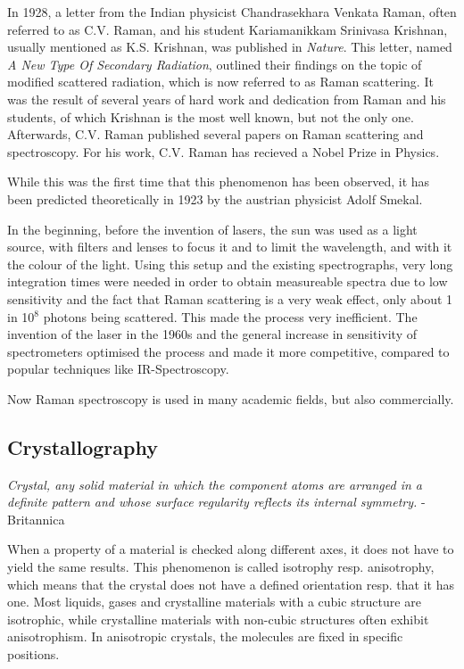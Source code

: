 In 1928, a letter from the Indian physicist Chandrasekhara Venkata Raman, often referred to as C.V. Raman, and his student Kariamanikkam Srinivasa Krishnan, usually mentioned as K.S. Krishnan, was published in \textit{Nature}. This letter, named \textit{A New Type Of Secondary Radiation}, outlined their findings on the topic of modified scattered radiation, which is now referred to as Raman scattering. It was the result of several years of hard work and dedication from Raman and his students, of which Krishnan is the most well known, but not the only one. Afterwards, C.V. Raman published several papers on Raman scattering and spectroscopy. For his work, C.V. Raman has recieved a Nobel Prize in Physics. \cite{ram28}
\bigskip

While this was the first time that this phenomenon has been observed, it has been predicted theoretically in 1923 by the austrian physicist Adolf Smekal.
\bigskip

In the beginning, before the invention of lasers, the sun was used as a light source, with filters and lenses to focus it and to limit the wavelength, and with it the colour of the light. Using this setup and the existing spectrographs, very long integration times were needed in order to obtain measureable  spectra due to low sensitivity and the fact that Raman scattering is a very weak effect, only about 1 in 10\(^8\) photons being scattered. This made the process very inefficient. The invention of the laser in the 1960s and the general increase in sensitivity of spectrometers optimised the process and made it more competitive, compared to popular techniques like IR-Spectroscopy.
\bigskip

Now Raman spectroscopy is used in many academic fields, but also commercially.

\newpage

\subsection{Crystallography}
\textit{Crystal, any solid material in which the component atoms are arranged in a definite pattern and whose surface regularity reflects its internal symmetry.} - Britannica \cite{brittanica}

\bigskip

When a property of a material is checked along different axes, it does not have to yield the same results. This phenomenon is called isotrophy resp. anisotrophy, which means that the crystal does not have a defined orientation resp. that it has one. Most liquids, gases and crystalline materials with a cubic structure are isotrophic, while crystalline materials with non-cubic structures often exhibit anisotrophism. In anisotropic crystals, the molecules are fixed in specific positions. 



